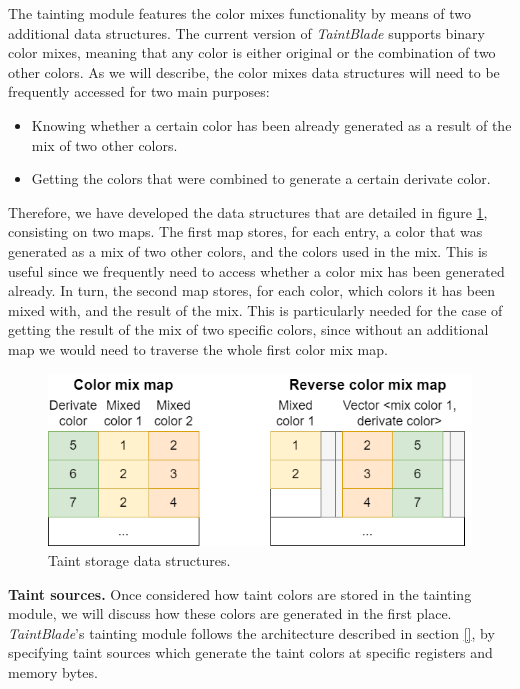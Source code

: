 \documentclass[conference]{IEEEtran}
\begin{document}
The tainting module features the color mixes functionality by means of two
additional data structures. The current version of \textit{TaintBlade} supports
binary color mixes, meaning that any color is either original or the
combination of two other colors. As we will describe, the color mixes data
structures will need to be frequently accessed for two main purposes:
\begin{itemize}
    \item Knowing whether a certain color has been already generated as a result of the
          mix of two other colors.
    \item Getting the colors that were combined to generate a certain derivate color.
\end{itemize}

Therefore, we have developed the data structures that are detailed in figure
\ref{figure:colormixtaintarch}, consisting on two maps. The first map stores,
for each entry, a color that was generated as a mix of two other colors, and
the colors used in the mix. This is useful since we frequently need to access
whether a color mix has been generated already. In turn, the second map stores,
for each color, which colors it has been mixed with, and the result of the mix.
This is particularly needed for the case of getting the result of the mix of
two specific colors, since without an additional map we would need to traverse
the whole first color mix map.

\begin{figure}
    \centerline{\includegraphics[width=0.9\columnwidth]{images/colormixtaintarch.drawio.png}}
    \caption{Taint storage data structures.}
    \label{figure:colormixtaintarch}
\end{figure}

\textbf{Taint sources.} Once considered how taint colors are stored in the tainting
module, we will discuss how these colors are generated in the first place. \textit{TaintBlade}'s
tainting module follows the architecture described in section \ref{}, by specifying taint sources
which generate the taint colors at specific registers and memory bytes.
\end{document}
